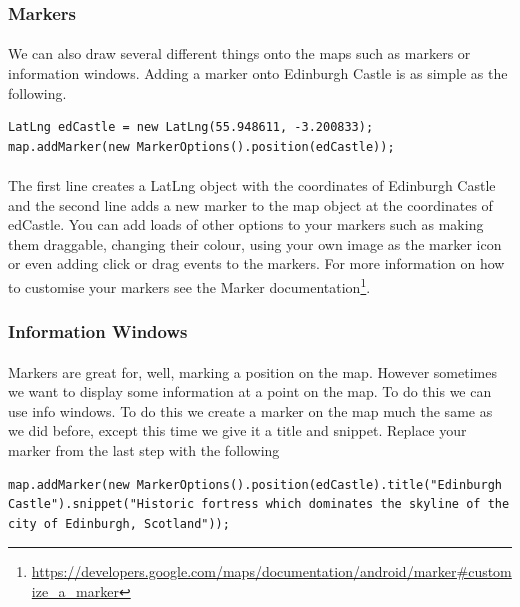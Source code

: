 \subsubsection{Markers}
\paragraph{} We can also draw several different things onto the maps such as markers or information windows.  Adding a marker onto Edinburgh Castle is as simple as the following.

\begin{lstlisting}
LatLng edCastle = new LatLng(55.948611, -3.200833);
map.addMarker(new MarkerOptions().position(edCastle));
\end{lstlisting}

\paragraph{} The first line creates a LatLng object with the coordinates of Edinburgh Castle and the second line adds a new marker to the map object at the coordinates of edCastle.  You can add loads of other options to your markers such as making them draggable, changing their colour, using your own image as the marker icon or even adding click or drag events to the markers.  For more information on how to customise your markers see the Marker documentation\footnote{\url{https://developers.google.com/maps/documentation/android/marker\#customize_a_marker}}.

\subsubsection{Information Windows}
\paragraph{} Markers are great for, well, marking a position on the map.  However sometimes we want to display some information at a point on the map.  To do this we can use info windows.  To do this we create a marker on the map much the same as we did before, except this time we give it a title and snippet.  Replace your marker from the last step with the following

\begin{lstlisting}
map.addMarker(new MarkerOptions().position(edCastle).title("Edinburgh Castle").snippet("Historic fortress which dominates the skyline of the city of Edinburgh, Scotland"));
\end{lstlisting}

